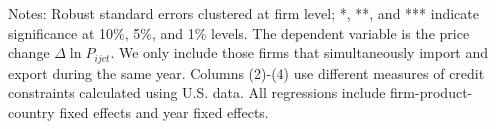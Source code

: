 \begin{table}
\begin{threeparttable}
\begin{tabular}{lcccccccc}
			\bottomrule
		\end{tabular}
		\begin{tablenotes}
			\footnotesize
			\item Notes: Robust standard errors clustered at firm level; *, **, and *** indicate significance at 10\%, 5\%, and 1\% levels. The dependent variable is the price change $\Delta \ln P_{ijct}$. We only include those firms that simultaneously import and export during the same year. Columns (2)-(4) use different measures of credit constraints calculated using U.S. data. All regressions include firm-product-country fixed effects and year fixed effects.
		\end{tablenotes}
	\end{threeparttable}
	\label{tab.robust.tradetype}
\end{table}

